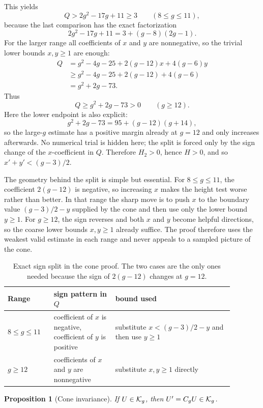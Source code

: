 \documentclass[11pt]{article}
\newtheorem{proposition}[theorem]{Proposition}
\theoremstyle{remark}
\numberwithin{equation}{section}
\begin{document}
This yields
\[
Q>2g^2-17g+11\geq 3 \qquad (8\leq g\leq 11),
\]
because the last comparison has the exact factorization
\[
2g^2-17g+11=3+(g-8)(2g-1).
\]
For the larger range all coefficients of \(x\) and \(y\) are
nonnegative, so the trivial lower bounds \(x,y\geq 1\) are enough:
\begin{align*}
Q
&=g^2-4g-25+2(g-12)x+4(g-6)y\\
&\geq g^2-4g-25+2(g-12)+4(g-6)\\
&=g^2+2g-73.
\end{align*}
Thus
\[
Q\geq g^2+2g-73>0 \qquad (g\geq 12).
\]
Here the lower endpoint is also explicit:
\[
g^2+2g-73=95+(g-12)(g+14),
\]
so the large-\(g\) estimate has a positive margin already at \(g=12\) and
only increases afterwards.
No numerical trial is hidden here; the split is forced only by the sign change
of the \(x\)-coefficient in \(Q\).  Therefore \(H_2>0\), hence \(H>0\), and so
\(x'+y'<(g-3)/2\).

The geometry behind the split is simple but essential.  For \(8\leq g\leq 11\),
the coefficient \(2(g-12)\) is negative, so increasing \(x\) makes the height
test worse rather than better.  In that range the sharp move is to push \(x\)
to the boundary value \((g-3)/2-y\) supplied by the cone and then use only the
lower bound \(y\geq 1\).  For \(g\geq 12\), the sign reverses and both \(x\)
and \(y\) become helpful directions, so the coarse lower bounds \(x,y\geq 1\)
already suffice.  The proof therefore uses the weakest valid estimate in each
range and never appeals to a sampled picture of the cone.

\begin{table}[t]
\centering
\small
\begin{tabular}{p{0.18\linewidth}p{0.24\linewidth}p{0.46\linewidth}}
\toprule
Range & sign pattern in \(Q\) & bound used \\
\midrule
\(8\leq g\leq 11\) & coefficient of \(x\) is negative, coefficient of \(y\) is positive & substitute \(x<(g-3)/2-y\) and then use \(y\geq 1\) \\
\(g\geq 12\) & coefficients of \(x\) and \(y\) are nonnegative & substitute \(x,y\geq 1\) directly \\
\bottomrule
\end{tabular}
\caption{Exact sign split in the cone proof.  The two cases are the only ones needed because the sign of \(2(g-12)\) changes at \(g=12\).}
\label{tab:conesplit}
\end{table}

\begin{proposition}[Cone invariance]\label{prop:cone}
If \(U\in \mathcal{K}_g\), then \(U'=C_g U\in \mathcal{K}_g\).
\end{proposition}
\end{document}
